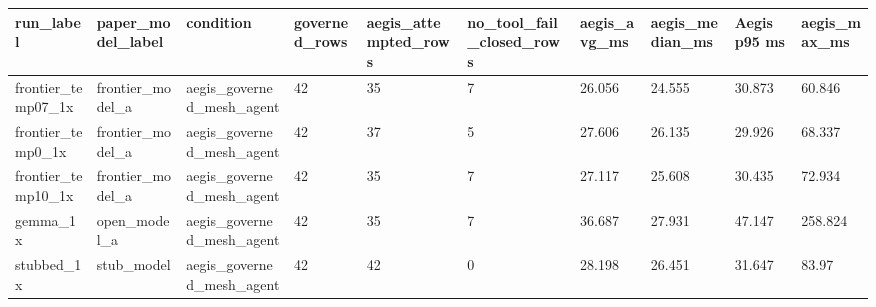 \begin{tabular}{llllllllll}
 \hline
run\_label & paper\_model\_label & condition & governed\_rows & aegis\_attempted\_rows & no\_tool\_fail\_closed\_rows & aegis\_avg\_ms & aegis\_median\_ms & Aegis p95 ms & aegis\_max\_ms \\
 \hline
frontier\_temp07\_1x & frontier\_model\_a & aegis\_governed\_mesh\_agent & 42 & 35 & 7 & 26.056 & 24.555 & 30.873 & 60.846 \\
frontier\_temp0\_1x & frontier\_model\_a & aegis\_governed\_mesh\_agent & 42 & 37 & 5 & 27.606 & 26.135 & 29.926 & 68.337 \\
frontier\_temp10\_1x & frontier\_model\_a & aegis\_governed\_mesh\_agent & 42 & 35 & 7 & 27.117 & 25.608 & 30.435 & 72.934 \\
gemma\_1x & open\_model\_a & aegis\_governed\_mesh\_agent & 42 & 35 & 7 & 36.687 & 27.931 & 47.147 & 258.824 \\
stubbed\_1x & stub\_model & aegis\_governed\_mesh\_agent & 42 & 42 & 0 & 28.198 & 26.451 & 31.647 & 83.97 \\
 \hline
\end{tabular}
